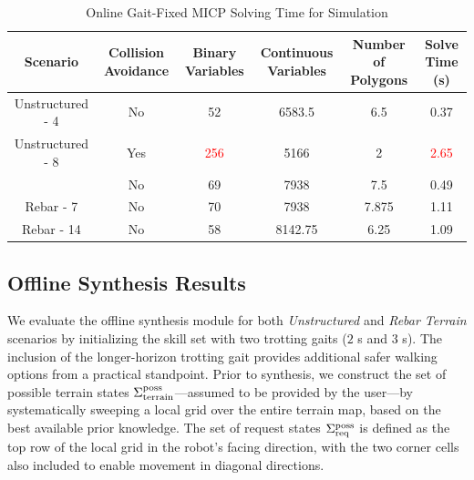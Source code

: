 \begin{table}
\centering
\small
    \caption{Online Gait-Fixed MICP Solving Time for Simulation}
    \setlength{\tabcolsep}{4pt}
     \begin{tabular*}{\linewidth}{@{\extracolsep{\fill}}cccccc}
         \hline
         \textbf{Scenario} & \textbf{Collision Avoidance} &
         \textbf{Binary Variables} &
         \textbf{Continuous Variables} &
         \textbf{Number of Polygons} &
         \textbf{Solve Time (s)}\\\hline
         Unstructured - 4 & No & 52 & 6583.5 & 6.5 & 0.37\\\hline
         Unstructured - 8 & Yes & \textcolor{red}{256} & 5166 & 2 & \textcolor{red}{2.65}\\
         & No & 69 & 7938 & 7.5 & 0.49\\\hline
         Rebar - 7& No & 70 & 7938 & 7.875 & 1.11\\
         \hline
         Rebar - 14 & No & 58 & 8142.75 & 6.25 & 1.09\\\hline
    \end{tabular*}
    \label{tab:micp_speed}
\end{table}

\subsection{Offline Synthesis Results}
We evaluate the offline synthesis module for both \textit{Unstructured} and \textit{Rebar Terrain} scenarios by initializing the skill set with two trotting gaits ($2$ s and $3$ s). The inclusion of the longer-horizon trotting gait provides additional safer walking options from a practical standpoint. Prior to synthesis, we construct the set of possible terrain states $\Sigma_{\textrm{terrain}}^{\textrm{poss}}$—assumed to be provided by the user—by systematically sweeping a local grid over the entire terrain map, based on the best available prior knowledge. The set of request states $\Sigma_{\textrm{req}}^{\textrm{poss}}$ is defined as the top row of the local grid in the robot's facing direction, with the two corner cells also included to enable movement in diagonal directions.


